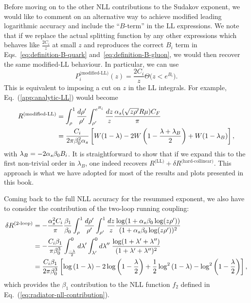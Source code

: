 Before moving on to the other NLL contributions to the Sudakov
exponent, we would like to comment on an alternative way to achieve
modified leading logarithmic accuracy and include the ``$B$-term'' in the LL
expressions. We note that if we replace the actual splitting function
by any other expressions which behaves like $\tfrac{2C_i}{z}$ at small
$z$ and reproduces the correct $B_i$ term in
Eqs.~\eqref{eq:definition-B-quark} and~\eqref{eq:definition-B-gluon},
we would then recover the same modified-LL behaviour.
%
In particular, we can use
\begin{equation}\label{eq:splitting-B-term}
  P_i^\text{(modified-LL)}(z) =
  \frac{2C_i}{z}\Theta\big(z<e^{B_i}\big).
\end{equation}
This is equivalent to imposing a cut on $z$ in the LL integrals.
%
For example, Eq.~(\ref{app:analytic-LL}) would become
\begin{align}\label{app:analytic-LL-modB}
  R^{\text{(modified-LL)}}
  & = \int_\rho^1 \frac{d \rho'}{\rho'}
    \int_{\rho'}^{e^{B_i}} \frac{d z}{z}
    \frac{\alpha_s( \sqrt{z \rho'} R\mu)C_F}{\pi}  \\
  &= \frac{C_i}{2 \pi \beta_0^2 \alpha_s} \left[
    W(1- \lambda)
    -2W\left (1-\frac{\lambda+\lambda_B}{2}\right)
    +W(1-\lambda_B)\right],\nonumber
\end{align}
with $\lambda_B = -2\alpha_s\beta_0B_i$.
%
It is straightforward to show that if we expand this to the first
non-trivial order in $\lambda_B$, one indeed recovers
$R^\text{(LL)}+\delta R^\text{(hard-collinear)}$.
%
This approach is what we have adopted for most of the results and
plots presented in this book.

Coming back to the full NLL accuracy for the resummed exponent, we also have to consider the
contribution of the two-loop running coupling:
\begin{align}\label{app:analytic-beta1}
  \delta R^{\text{(2-loop)}}
  & = -\frac{\alpha_s^2 C_i}{\pi}\frac{\beta_1}{\beta_0}
    \int_\rho^1 \frac{d \rho'}{\rho'} \int_{\rho'}^1 \frac{d z}{z} 
    \frac{\log(1+\alpha_s\beta_0\log(z\rho'))}{(1+\alpha_s\beta_0\log(z\rho'))^2}\\
  & = -\frac{C_i \beta_1 }{ \pi \beta_0^3}  \int_\frac{-\lambda}{2}^0 d \lambda' \int_{\lambda'}^0 d \lambda'' \; \frac{\log(1+\lambda'+\lambda'' )}{(1+\lambda'+\lambda'' )^2}\nonumber \\
&=\frac{C_i \beta_1}{2 \pi \beta_0^3} \left [ \log \left (1-\lambda \right )-2 \log 
\left (1-\frac{\lambda}{2} \right ) + \frac{1}{2} \log^2 \left (1-  \lambda \right ) 
- \log^2 \left (1-\frac{\lambda}{2} \right ) \right ],\nonumber
\end{align}
which provides the $\beta_1$ contribution to the NLL function $f_2$ defined in Eq.~(\ref{eq:radiator-nll-contribution}).


